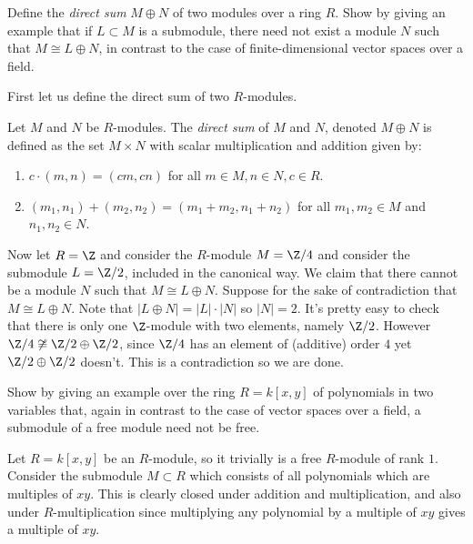 \documentclass[11pt,letterpaper]{article}
\begin{document}
\pagebreak
\begin{problem}
  Define the \emph{direct sum} $M\oplus N$ of two modules over a ring $R$. Show by giving an example that if $L \subset M$ is a submodule, there need not exist a module $N$ such that $M \cong L \oplus N$, in contrast to the case of finite-dimensional vector spaces over a field.
\end{problem}
First let us define the direct sum of two $R$-modules.
\begin{definition}
  Let $M$ and $N$ be $R$-modules. The {\em direct sum} of $M$ and $N$, denoted $M\oplus N$ is defined as the set $M\times N$ with scalar multiplication and addition given by:
  \begin{enumerate}
      \item $c\cdot (m,n)= (cm, cn)$ for all $m\in M, n\in N, c\in R$.
      \item $(m_1, n_1) + (m_2, n_2) = (m_1 + m_2, n_1 + n_2)$ for all $m_1,m_2\in M$ and $n_1,n_2\in N$.     
    \end{enumerate}    
  \end{definition} 
  Now let $R=\Z$ and consider the $R$-module $M=\Z/4$ and consider the submodule $L=\Z/2$, included in the canonical way. We claim that there cannot be a module $N$ such that $M\cong L\oplus N$. Suppose for the sake of contradiction that $M\cong L\oplus N$. Note that $|L\oplus N| = |L|\cdot |N|$ so $|N|=2$. It's pretty easy to check that there is only one $\Z$-module with two elements, namely $\Z/2$. However $\Z/4\not\cong \Z/2\oplus \Z/2$, since $\Z/4$ has an element of (additive) order $4$ yet $\Z/2\oplus\Z/2$ doesn't. This is a contradiction so we are done.    

\pagebreak
\begin{problem}
  Show by giving an example over the ring $R = k[x,y]$ of polynomials in two variables that, again in contrast to the case of vector spaces over a field, a submodule of a free module need not be free.
  \end{problem}
  
Let $R = k[x,y]$ be an $R$-module, so it trivially is a free $R$-module of rank $1$. Consider the submodule $M\subset R$ which consists of all polynomials which are multiples of $xy$. This is clearly closed under addition and multiplication, and also under $R$-multiplication since multiplying any polynomial by a multiple of $xy$ gives a multiple of $xy$.
\end{document}
